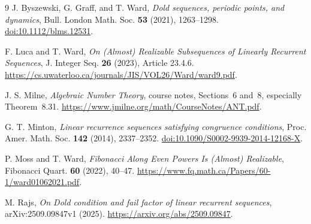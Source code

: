\documentclass[11pt]{article}
\theoremstyle{remark}
\begin{document}
\begin{thebibliography}{9}
J. Byszewski, G. Graff, and T. Ward,
\emph{Dold sequences, periodic points, and dynamics},
Bull. London Math. Soc. \textbf{53} (2021), 1263--1298.
\href{https://doi.org/10.1112/blms.12531}{doi:10.1112/blms.12531}.

F. Luca and T. Ward,
\emph{On (Almost) Realizable Subsequences of Linearly Recurrent Sequences},
J. Integer Seq. \textbf{26} (2023), Article 23.4.6.
\url{https://cs.uwaterloo.ca/journals/JIS/VOL26/Ward/ward9.pdf}.

J. S. Milne,
\emph{Algebraic Number Theory}, course notes, Sections~6 and~8, especially Theorem~8.31.
\url{https://www.jmilne.org/math/CourseNotes/ANT.pdf}.

G. T. Minton,
\emph{Linear recurrence sequences satisfying congruence conditions},
Proc. Amer. Math. Soc. \textbf{142} (2014), 2337--2352.
\href{https://doi.org/10.1090/S0002-9939-2014-12168-X}{doi:10.1090/S0002-9939-2014-12168-X}.

P. Moss and T. Ward,
\emph{Fibonacci Along Even Powers Is (Almost) Realizable},
Fibonacci Quart. \textbf{60} (2022), 40--47.
\url{https://www.fq.math.ca/Papers/60-1/ward01062021.pdf}.

M. Rajs,
\emph{On Dold condition and fail factor of linear recurrent sequences},
arXiv:2509.09847v1 (2025).
\url{https://arxiv.org/abs/2509.09847}.
\end{thebibliography}
\end{document}
